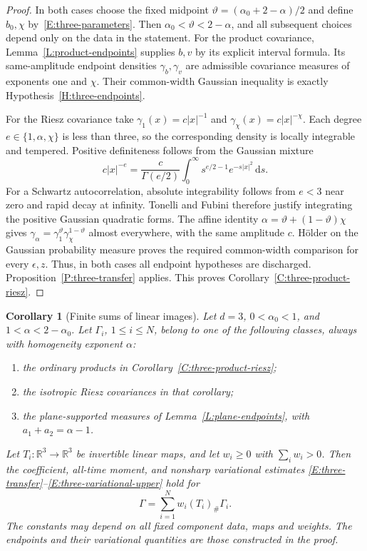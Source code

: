 \documentclass[12pt,oneside,openany]{book}
\makeatletter
\let\lean@pending\@empty
\newcommand{\LeanMarker}[1]{\gdef\lean@pending{#1}}
\numberwithin{equation}{section}
\newtheorem{corollary}[theorem]{Corollary}
\theoremstyle{nogostyle}
\theoremstyle{definition}
\newcommand{\R}{\mathbb{R}}
\newcommand{\ud}{\,\mathrm{d}}
\makeatother
\begin{document}
\begin{proof}
  In both cases choose the fixed midpoint $\vartheta = (\alpha_0+2-\alpha)/2$
  and define $b_0,\chi$ by~\eqref{E:three-parameters}. Then $\alpha_0 <
  \vartheta < 2-\alpha$, and all subsequent choices depend only on the data in
  the statement. For the product covariance, Lemma~\ref{L:product-endpoints}
  supplies $b,v$ by its explicit interval formula. Its same-amplitude endpoint
  densities $\gamma_b,\gamma_v$ are admissible covariance measures of exponents
  one and $\chi$. Their common-width Gaussian inequality is exactly
  Hypothesis~\ref{H:three-endpoints}.

  For the Riesz covariance take $\gamma_1(x) = c|x|^{-1}$ and $\gamma_\chi(x) =
  c|x|^{-\chi}$. Each degree $e \in \{1,\alpha,\chi\}$ is less than three, so
  the corresponding density is locally integrable and tempered. Positive
  definiteness follows from the Gaussian mixture
  \[
    c|x|^{-e}=\frac{c}{\Gamma(e/2)}
    \int_0^\infty s^{e/2-1}e^{-s|x|^2}\ud s.
  \]
  For a Schwartz autocorrelation, absolute integrability follows from $e < 3$
  near zero and rapid decay at infinity. Tonelli and Fubini therefore justify
  integrating the positive Gaussian quadratic forms. The affine identity $\alpha
  = \vartheta+(1-\vartheta)\chi$ gives $\gamma_\alpha =
  \gamma_1^\vartheta\gamma_\chi^{1-\vartheta}$ almost everywhere, with the same
  amplitude $c$. H\"older on the Gaussian probability measure proves the
  required common-width comparison for every $\epsilon,z$. Thus, in both cases
  all endpoint hypotheses are discharged. Proposition~\ref{P:three-transfer}
  applies. This proves Corollary~\ref{C:three-product-riesz}.
\end{proof}

\LeanMarker{C:three-finite-images}
\begin{corollary}[Finite sums of linear images]\label{C:three-finite-images}
  Let $d = 3$, $0 < \alpha_0 < 1$, and $1 < \alpha < 2-\alpha_0$. Let
  $\Gamma_i$, $1 \le i \le N$, belong to one of the following classes, always
  with homogeneity exponent $\alpha$:
  \begin{enumerate}
    \item the ordinary products in Corollary~\ref{C:three-product-riesz};
    \item the isotropic Riesz covariances in that corollary;
    \item the plane-supported measures of Lemma~\ref{L:plane-endpoints},
      with $a_1+a_2 = \alpha-1$.
  \end{enumerate}
  Let $T_i:\R^3 \to \R^3$ be invertible linear maps, and let $w_i \ge 0$ with
  $\sum_iw_i > 0$. Then the coefficient, all-time moment, and nonsharp
  variational estimates
  \eqref{E:three-transfer}--\eqref{E:three-variational-upper} hold for
  \[
    \Gamma=\sum_{i=1}^Nw_i(T_i)_\#\Gamma_i.
  \]
  The constants may depend on all fixed component data, maps and weights. The
  endpoints and their variational quantities are those constructed in the proof.
\end{corollary}
\end{document}
